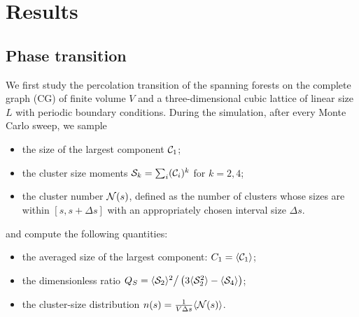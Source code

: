 \chapter{Results}\label{chap:results}

\section{Phase transition}\label{sec:phase_transition}
We first study the percolation transition of the spanning forests on the complete graph (CG) of finite volume $V$ and
a three-dimensional cubic lattice of linear size $L$ with periodic boundary conditions. During the simulation, after every Monte Carlo sweep, we sample 
\begin{itemize}
	\item the size of the largest component ${\mathcal C}_1$;
	\item the cluster size moments ${\mathcal S}_k = \sum_i ({\mathcal C}_i)^k$ for $k=2, 4$;
	\item the cluster number ${\mathcal N}(s)$, defined as the number of clusters whose sizes are within $[s, s + \Delta s]$ 
	with an appropriately chosen interval size $\Delta s$.

\end{itemize}
and compute the following quantities:
\begin{itemize}
	\item the averaged size of the largest component: $C_1 = \langle {\mathcal C}_1 \rangle$;
	\item the dimensionless ratio\cite{Qian2005} $Q_S = \langle {\mathcal S}_2\rangle^2\big/\left(3\langle {\mathcal S}_2^2 \rangle - \langle {\mathcal S}_4\rangle\right)$;
	\item the cluster-size distribution $n(s)= \frac{1}{V\Delta s} \langle {\mathcal N}(s)\rangle$.
\end{itemize}

